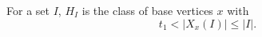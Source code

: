 \begin{definition}
For a set \(I\), \(H_I\) is the class of base vertices \(x\) with
\[
t_1<|X_x(I)|\le |I|.
\]
\end{definition}
